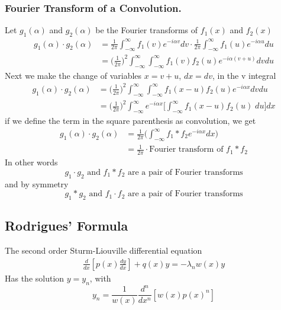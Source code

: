 \documentclass[../../../main.tex]{subfiles}
\begin{document}
\subsubsection{Fourier Transform of a Convolution.} Let $g_1(\alpha)$ and $g_2(\alpha)$ be the Fourier transforms of $f_1(x)$ and $f_2(x)$
\begin{align*}
    g_1(\alpha)\cdot g_2(\alpha) & =\frac{1}{2\pi}\int_{-\infty}^{\infty}f_1(v)e^{-i\alpha v}dv\cdot \frac{1}{2\pi}\int_{-\infty}^{\infty}f_1(u)e^{-i\alpha u}du \\
                                 & =\biggl(\frac{1}{2\pi}\biggr)^2\int_{-\infty}^{\infty}\int_{-\infty}^{\infty} f_1(v)f_2(u)e^{-i\alpha (v+u)}dvdu
\end{align*}
Next we make the change of variables $x = v + u$, $dx = dv$, in the v integral
\begin{align*}
    g_1(\alpha)\cdot g_2(\alpha) & = \biggl(\frac{1}{2\pi}\biggr)^2\int_{-\infty}^{\infty}\int_{-\infty}^{\infty} f_1(x-u)f_2(u)e^{-i\alpha x}dvdu                \\
                                 & = \biggl(\frac{1}{2\pi}\biggr)^2\int_{-\infty}^{\infty}e^{-i\alpha x}\biggl[\int_{-\infty}^{\infty}f_1(x-u)f_2(u)\;du\biggr]dx
\end{align*}
if we define the term in the square parenthesis as convolution, we get
\begin{align*}
    g_1(\alpha)\cdot g_2(\alpha) & =\frac{1}{2\pi}\biggl(\int_{-\infty}^{\infty}f_1*f_2e^{-i\alpha x}dx\biggr) \\
                                 & =\frac{1}{2\pi}\cdot\text{Fourier transform of }f_1*f_2
\end{align*}
In other words
\begin{equation*}
    g_1\cdot g_2\text{ and }f_1*f_2\text{ are a pair of Fourier transforms}
\end{equation*}
and by symmetry
\begin{equation*}
    g_1* g_2\text{ and }f_1\cdot f_2\text{ are a pair of Fourier transforms}
\end{equation*}

\subsection{Rodrigues' Formula}
The second order Sturm-Liouville differential equation
\begin{align*}
    \frac{d}{dx} \left[p(x) \frac{dy}{dx}\right] + q(x)y = -\lambda_n w(x) y
\end{align*}
Has the solution $y=y_n$, with
\begin{equation*}
    y_n=\frac{1}{w(x)}\frac{d^n}{dx^n}[w(x)p(x)^n]
\end{equation*}
\end{document}
